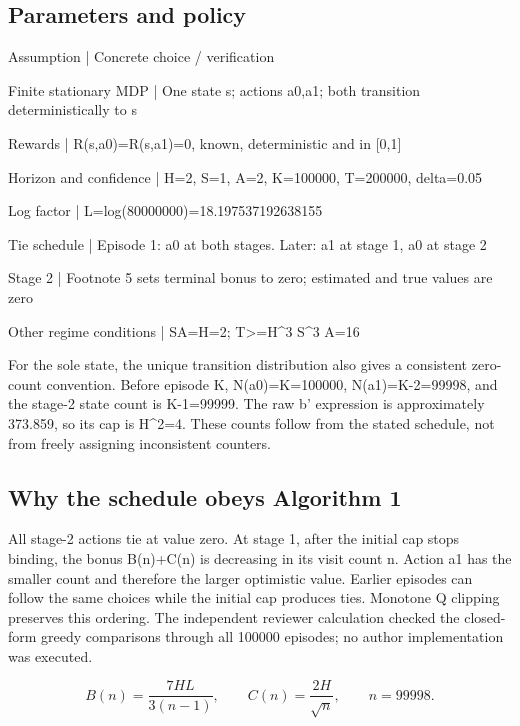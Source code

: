 \documentclass[10pt]{article}
\begin{document}
\subsection*{Parameters and policy}
Assumption | Concrete choice / verification\par
Finite stationary MDP | One state s; actions a0,a1; both transition deterministically to s\par
Rewards | R(s,a0)=R(s,a1)=0, known, deterministic and in [0,1]\par
Horizon and confidence | H=2, S=1, A=2, K=100000, T=200000, delta=0.05\par
Log factor | L=log(80000000)=18.197537192638155\par
Tie schedule | Episode 1: a0 at both stages. Later: a1 at stage 1, a0 at stage 2\par
Stage 2 | Footnote 5 sets terminal bonus to zero; estimated and true values are zero\par
Other regime conditions | SA=H=2; T>=H\textasciicircum{}3 S\textasciicircum{}3 A=16\par
For the sole state, the unique transition distribution also gives a consistent zero-count convention. Before episode K, N(a0)=K=100000, N(a1)=K-2=99998, and the stage-2 state count is K-1=99999. The raw b’ expression is approximately 373.859, so its cap is H\textasciicircum{}2=4. These counts follow from the stated schedule, not from freely assigning inconsistent counters.\par
\subsection*{Why the schedule obeys Algorithm 1}
All stage-2 actions tie at value zero. At stage 1, after the initial cap stops binding, the bonus B(n)+C(n) is decreasing in its visit count n. Action a1 has the smaller count and therefore the larger optimistic value. Earlier episodes can follow the same choices while the initial cap produces ties. Monotone Q clipping preserves this ordering. The independent reviewer calculation checked the closed-form greedy comparisons through all 100000 episodes; no author implementation was executed.\par
\[B(n)=\frac{7HL}{3(n-1)},\qquad C(n)=\frac{2H}{\sqrt n},\qquad n=99998.\]\par
\end{document}
